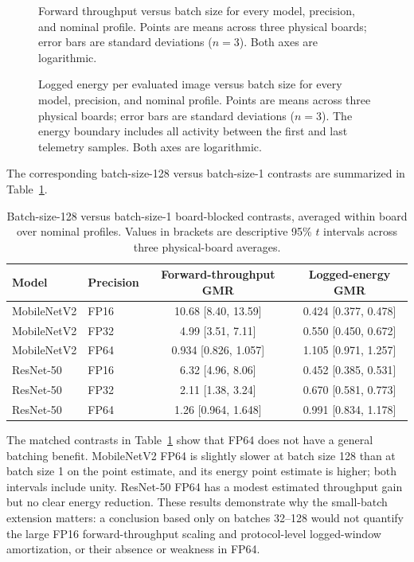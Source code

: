 \documentclass[electronics,article,submit,pdftex,moreauthors]{Definitions/mdpi}
\newcommand{\mobile}{MobileNetV2}
\newcommand{\resnet}{ResNet-50}
\renewcommand{\tabref}[1]{Table~\ref{#1}}
\begin{document}
\begin{figure}[t]
\centering

\caption{Forward throughput versus batch size for every model, precision, and nominal profile. Points are means across three physical boards; error bars are standard deviations ($n=3$). Both axes are logarithmic.}
\label{fig:batch-throughput}
\end{figure}

\begin{figure}[t]
\centering

\caption{Logged energy per evaluated image versus batch size for every model, precision, and nominal profile. Points are means across three physical boards; error bars are standard deviations ($n=3$). The energy boundary includes all activity between the first and last telemetry samples. Both axes are logarithmic.}
\label{fig:batch-energy}
\end{figure}

The corresponding batch-size-128 versus batch-size-1 contrasts are summarized in \tabref{tab:batch-contrasts}.

\begin{table}[t]
\caption{Batch-size-128 versus batch-size-1 board-blocked contrasts, averaged within board over nominal profiles. Values in brackets are descriptive 95\% $t$ intervals across three physical-board averages.}
\label{tab:batch-contrasts}
\centering
\small
\begin{tabular}{llcc}
\toprule
Model & Precision & Forward-throughput GMR & Logged-energy GMR \\
\midrule
\mobile{} & FP16 & 10.68 [8.40, 13.59] & 0.424 [0.377, 0.478] \\
\mobile{} & FP32 & 4.99 [3.51, 7.11] & 0.550 [0.450, 0.672] \\
\mobile{} & FP64 & 0.934 [0.826, 1.057] & 1.105 [0.971, 1.257] \\
\resnet{} & FP16 & 6.32 [4.96, 8.06] & 0.452 [0.385, 0.531] \\
\resnet{} & FP32 & 2.11 [1.38, 3.24] & 0.670 [0.581, 0.773] \\
\resnet{} & FP64 & 1.26 [0.964, 1.648] & 0.991 [0.834, 1.178] \\
\bottomrule
\end{tabular}
\end{table}

The matched contrasts in \tabref{tab:batch-contrasts} show that FP64 does not have a general batching benefit. \mobile{} FP64 is slightly slower at batch size 128 than at batch size 1 on the point estimate, and its energy point estimate is higher; both intervals include unity. \resnet{} FP64 has a modest estimated throughput gain but no clear energy reduction. These results demonstrate why the small-batch extension matters: a conclusion based only on batches 32--128 would not quantify the large FP16 forward-throughput scaling and protocol-level logged-window amortization, or their absence or weakness in FP64.
\end{document}
